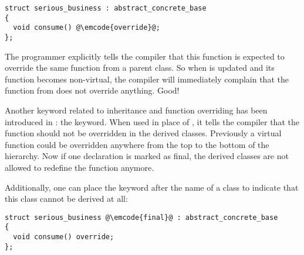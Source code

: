 \begin{lstlisting}
struct serious_business : abstract_concrete_base
{
  void consume() @\emcode{override}@;
};
\end{lstlisting}

The programmer explicitly tells the compiler that this function is
expected to override the same function from a parent class. So when
 is updated and its 
function becomes non-virtual, the compiler will immediately complain
that the function from  does not override
anything. Good!

\bigskip

Another keyword related to inheritance and function overriding has
been introduced in : the  keyword. When used in
place of , it tells the compiler that the function
should not be overridden in the derived classes. Previously a virtual
function could be overridden anywhere from the top to the bottom of
the hierarchy. Now if one declaration is marked as final, the derived
classes are not allowed to redefine the function anymore.

Additionally, one can place the  keyword after the name of
a class to indicate that this class cannot be derived at all:

\begin{lstlisting}
struct serious_business @\emcode{final}@ : abstract_concrete_base
{
  void consume() override;
};
\end{lstlisting}
